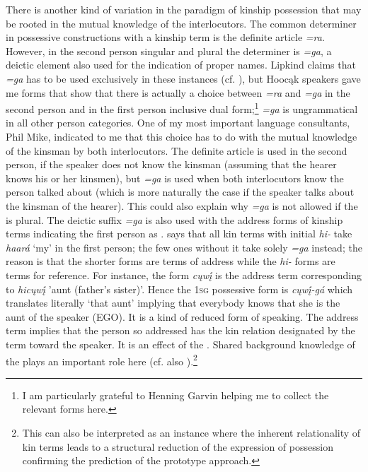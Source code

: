 \documentclass[output=paper]{LSP/langsci}
\begin{document}
There is another kind of variation in the paradigm of kinship possession that may be rooted in the mutual knowledge of the interlocutors. The common determiner in possessive constructions with a kinship term is the definite article \textit{=ra}. However, in the second person singular and plural the determiner is \textit{=ga}, a deictic element also used for the indication of proper names. Lipkind claims that \textit{=ga} has to be used exclusively in these instances (cf. \citealt[31]{Lipkind1945}), but Hoocąk speakers gave me forms that show that there is actually a choice between \textit{=ra} and \textit{=ga} in the second person and in the first person inclusive dual form;\footnote{I am particularly grateful to Henning Garvin helping me to collect the relevant forms here.} \textit{=ga} is ungrammatical in all other person categories. One of my most important language consultants, Phil Mike, indicated to me that this choice has to do with the mutual knowledge of the kinsman by both interlocutors. The definite article is used in the second person, if the speaker does not know the kinsman (assuming that the hearer knows his or her kinsmen), but \textit{=ga} is used when both interlocutors know the person talked about (which is more naturally the case if the speaker talks about the kinsman of the hearer). This could also explain why \textit{=ga} is not allowed if the  is plural. The deictic suffix \textit{=ga} is also used with the address forms of kinship terms indicating the first person as . \citet[31]{Lipkind1945} says that all kin terms with initial \textit{hi-} take \textit{haará} `my' in the first person; the few ones without it take solely \textit{=ga} instead; the reason is that the shorter forms are terms of address while the \textit{hi-} forms are terms for reference. For instance, the form \textit{cųwį́} is the address term corresponding to \textit{hicųwį́} 'aunt (father's sister)'. Hence the \textsc{1sg} possessive form is \textit{cųwį́-gá} which translates literally `that aunt' implying that everybody knows that she is the aunt of the speaker (EGO). It is a kind of reduced form of speaking. The address term implies that the person so addressed has the kin relation designated by the term toward the speaker. It is an effect of the . Shared background knowledge of the  plays an important role here (cf. also \citealt[26f]{Heine1997}).\footnote{This can also be interpreted as an instance where the inherent relationality of kin terms leads to a structural reduction of the expression of possession confirming the prediction of the prototype approach.}
\end{document}
